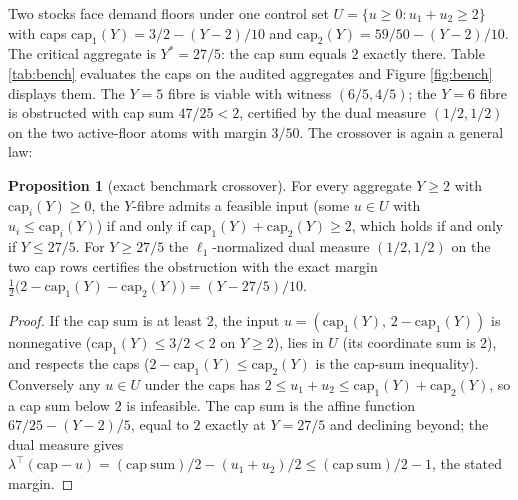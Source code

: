 \documentclass[10pt,twocolumn]{article}
\theoremstyle{definition}
\newtheorem{proposition}{Proposition}
\begin{document}
Two stocks face demand floors under one control set
\(U = \{u \ge 0 : u_1 + u_2 \ge 2\}\) with caps
\(\mathrm{cap}_1(Y) = 3/2 - (Y - 2)/10\) and
\(\mathrm{cap}_2(Y) = 59/50 - (Y - 2)/10\). The critical aggregate is
\(Y^{*} = 27/5\): the cap sum equals \(2\) exactly there. Table
\ref{tab:bench} evaluates the caps on the audited aggregates and Figure
\ref{fig:bench} displays them. The \(Y = 5\) fibre is viable with
witness \((6/5, 4/5)\); the \(Y = 6\) fibre is obstructed with cap sum
\(47/25 < 2\), certified by the dual measure \((1/2, 1/2)\) on the two
active-floor atoms with margin \(3/50\). The crossover is again a general law:

\begin{proposition}[exact benchmark crossover]\label{prop:bench}
For every aggregate \(Y \ge 2\) with \(\mathrm{cap}_i(Y) \ge 0\), the
\(Y\)-fibre admits a feasible input (some \(u \in U\) with
\(u_i \le \mathrm{cap}_i(Y)\)) if and only if
\(\mathrm{cap}_1(Y) + \mathrm{cap}_2(Y) \ge 2\), which holds if and
only if \(Y \le 27/5\). For \(Y \ge 27/5\) the
\(\ell_1\)-normalized dual measure \((1/2, 1/2)\) on the two cap rows
certifies the obstruction with the exact margin
\(\tfrac12\bigl(2 - \mathrm{cap}_1(Y) - \mathrm{cap}_2(Y)\bigr) =
(Y - 27/5)/10\).
\end{proposition}

\begin{proof}
If the cap sum is at least \(2\), the input
\(u = (\mathrm{cap}_1(Y),\, 2 - \mathrm{cap}_1(Y))\) is nonnegative
(\(\mathrm{cap}_1(Y) \le 3/2 < 2\) on \(Y \ge 2\)), lies in
\(U\) (its coordinate sum is \(2\)), and respects the caps
(\(2 - \mathrm{cap}_1(Y) \le \mathrm{cap}_2(Y)\) is the cap-sum
inequality). Conversely any \(u \in U\) under the caps has
\(2 \le u_1 + u_2 \le \mathrm{cap}_1(Y) + \mathrm{cap}_2(Y)\), so a
cap sum below \(2\) is infeasible. The cap sum is the affine function
\(67/25 - (Y - 2)/5\), equal to \(2\) exactly at \(Y = 27/5\) and
declining beyond; the dual measure gives
\(\lambda^\top(\mathrm{cap} - u) = (\mathrm{cap\ sum})/2 -
(u_1 + u_2)/2 \le (\mathrm{cap\ sum})/2 - 1\), the stated margin.
\end{proof}
\end{document}
